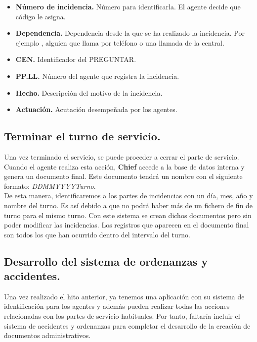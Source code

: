 \begin{itemize}
	\item \textbf{Número de incidencia.} Número para identificarla. El agente decide que código le asigna.
	\item \textbf{Dependencia.} Dependencia desde la que se ha realizado la incidencia. Por ejemplo , alguien que llama por teléfono o una llamada de la central.
	\item \textbf{CEN.} Identificador del PREGUNTAR.
	\item \textbf{PP.LL.} Número del agente que registra la incidencia.
	\item \textbf{Hecho.} Descripción del motivo de la incidencia.
	\item \textbf{Actuación.} Acutación desempeñada por los agentes.
\end{itemize}

\subsection{Terminar el turno de servicio.}

Una vez terminado el servicio, se puede proceder a cerrar el parte de servicio. Cuando el agente realiza esta acción, \textbf{Chief} accede 
a la base de datos interna y genera un documento final. Este documento tendrá un nombre con el siguiente formato: \textit{DD\textunderscore MM\textunderscore YYYY\textunderscore Turno}.\\	

De esta manera, identificaremos a los partes de incidencias con un día, mes, año y nombre del turno. Es así debido a que no podrá haber más de un fichero de fin 
de turno para el mismo turno. Con este sistema se crean dichos documentos pero sin poder modificar las incidencias. Los registros que aparecen en el documento
final son todos los que han ocurrido dentro del intervalo del turno.

\subsection{Desarrollo del sistema de ordenanzas y accidentes.}

Una vez realizado el hito anterior, ya tenemos una aplicación con su sistema de identificación para los agentes y además pueden realizar todas las acciones
relacionadas con los partes de servicio habituales. Por tanto, faltaría incluir el sistema de accidentes y ordenanzas para completar el desarrollo de la
creación de documentos administrativos.\\

